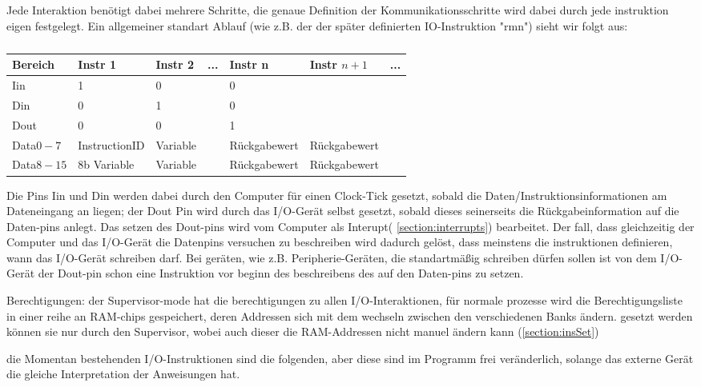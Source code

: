 \documentclass{scrartcl}
\begin{document}
Jede Interaktion benötigt dabei mehrere Schritte, die genaue Definition der Kommunikationsschritte wird dabei durch jede instruktion eigen festgelegt.
Ein allgemeiner standart Ablauf (wie z.B. der der später definierten IO-Instruktion "rmn") sieht wir folgt aus:

\begin{center}
	\begin{table}[h]
		\caption{\label{table:IO_Schem}}
		\begin{tabular}{l | l | l | l | l | l | l}
			 Bereich & Instr 1 & Instr 2 & ... & Instr n & Instr $n+1$ & ... \\
			\hline
			Iin & 1 & 0 &   & 0 & \\
			Din & 0 & 1 &   & 0 & \\
			Dout & 0 & 0 &   & 1 & \\
			Data$0-7$ & InstructionID & Variable &   & Rückgabewert & Rückgabewert \\
			Data$8-15$ & 8b Variable & Variable &   & Rückgabewert & Rückgabewert
 		\end{tabular}
	\end{table}
\end{center}

Die Pins Iin und Din werden dabei durch den Computer für einen Clock-Tick gesetzt, sobald die Daten/Instruktionsinformationen am Dateneingang an liegen; der Dout Pin wird durch das I/O-Gerät selbst gesetzt, sobald dieses seinerseits die Rückgabeinformation auf die Daten-pins anlegt.
Das setzen des Dout-pins wird vom Computer als Interupt( \autoref{section:interrupts}) bearbeitet.
Der fall, dass gleichzeitig der Computer und das I/O-Gerät die Datenpins versuchen zu beschreiben wird dadurch gelöst, dass meinstens die instruktionen definieren, wann das I/O-Gerät schreiben darf. Bei geräten, wie z.B. Peripherie-Geräten, die standartmäßig schreiben dürfen sollen ist von dem I/O-Gerät der Dout-pin schon eine Instruktion vor beginn des beschreibens des auf den Daten-pins zu setzen.

Berechtigungen: der Supervisor-mode hat die berechtigungen zu allen I/O-Interaktionen, für normale prozesse wird die Berechtigungsliste in einer reihe an RAM-chips gespeichert, deren Addressen sich mit dem wechseln zwischen den verschiedenen Banks ändern.
gesetzt werden können sie nur durch den Supervisor, wobei auch dieser die RAM-Addressen nicht manuel ändern kann (\autoref{section:insSet})

die Momentan bestehenden I/O-Instruktionen sind die folgenden, aber diese sind im Programm frei veränderlich, solange das externe Gerät die gleiche Interpretation der Anweisungen hat.
\end{document}

